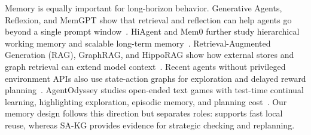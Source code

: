 Memory is equally important for long-horizon behavior. Generative Agents,
Reflexion, and MemGPT show that retrieval and reflection can help agents go
beyond a single prompt window~\citep{park2023generativeagents,shinn2023reflexion,packer2023memgpt}.
HiAgent and Mem0 further study hierarchical working memory and scalable
long-term memory~\citep{hu2025hiagent,chhikara2025mem0}. Retrieval-Augmented
Generation (RAG), GraphRAG,
and HippoRAG show how external stores and graph retrieval can extend model
context~\citep{lewis2020rag,edge2024graphrag,gutierrez2024hipporag}.
Recent agents without privileged environment APIs also use state-action graphs
for exploration and delayed reward planning~\citep{tang2025experiencedriven}.
AgentOdyssey studies open-ended text games with test-time continual learning,
highlighting exploration, episodic memory, and planning cost~\citep{agentodyssey2026}.
Our memory design follows this direction but separates roles: \samb{} supports
fast local reuse, whereas SA-KG provides evidence for strategic checking and
replanning.

